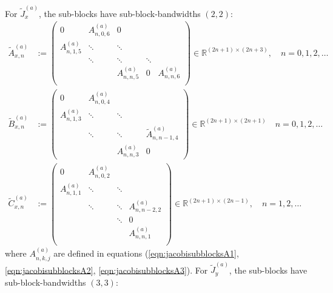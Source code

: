 \documentclass[11pt, oneside]{article}   	%
\newcommand{\R}{\mathbb{R}}
\begin{document}
For $\tilde J_x^{(a)}$, the sub-blocks have sub-block-bandwidths $(2,2)$:
\begin{align*}
	\tilde A^{(a)}_{x,n} &:= 
		\begin{pmatrix}
			0 & A^{(a)}_{n,0,6} & 0 & & \\
			A^{(a)}_{n,1,5} & \ddots & \ddots & & \\
			& \ddots & \ddots & \ddots & \\
			& & A^{(a)}_{n,n,5} & 0 & A^{(a)}_{n,n,6} \\
		\end{pmatrix} \in \R^{(2n+1)\times(2n+3)}, \quad n = 0,1,2,\dots \\
	\tilde B^{(a)}_{x,n} &:= 
		\begin{pmatrix}
			0 & A^{(a)}_{n,0,4} & & \\
			A^{(a)}_{n,1,3} & \ddots & \ddots & \\
			& \ddots & \ddots & \tilde A^{(a)}_{n,n-1,4} \\
			& & A^{(a)}_{n,n,3} & 0
		\end{pmatrix} \in \R^{(2n+1)\times(2n+1)}  \quad n = 0,1,2,\dots \\
	\tilde C^{(a)}_{x,n} &:= 
		\begin{pmatrix}
			0 & A^{(a)}_{n,0,2} & & \\
			A^{(a)}_{n,1,1} & \ddots & \ddots & \\
			& \ddots & \ddots &A^{(a)}_{n,n-2,2} \\
			& & \ddots & 0 \\
			& & & A^{(a)}_{n,n,1} \\
		\end{pmatrix} \in \R^{(2n+1)\times(2n-1)}, \quad n = 1,2,\dots
\end{align*}
where $A^{(a)}_{n,k,j}$ are defined in equations (\ref{eqn:jacobisubblocksA1}, \ref{eqn:jacobisubblocksA2}, \ref{eqn:jacobisubblocksA3}). For $\tilde J_y^{(a)}$, the sub-blocks have sub-block-bandwidths $(3,3)$:
\end{document}
